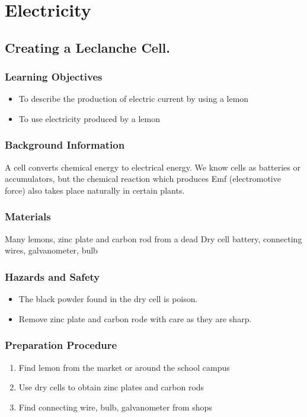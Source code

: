 \section{Electricity}

\subsection{Creating a Leclanche Cell.}

\subsubsection*{Learning Objectives}
\begin{itemize}
\item{To describe the production of electric current by using a lemon}
\item{To use electricity produced by a lemon}
\end{itemize}

\subsubsection*{Background Information}
A cell converts chemical energy to electrical energy.  We know cells as batteries or accumulators, but the chemical reaction which produces Emf (electromotive force) also takes place naturally in certain plants.

\subsubsection*{Materials}
Many lemons, zinc plate and carbon rod from a dead Dry cell battery, connecting wires, galvanometer, bulb

\subsubsection*{Hazards and Safety}
\begin{itemize}
\item{The black powder found in the dry cell is poison.}
\item{Remove zinc plate and carbon rode with care as they are sharp.}
\end{itemize}

\subsubsection*{Preparation Procedure}
\begin{enumerate}
\item{Find lemon from the market or around the school campus}
\item{Use dry cells to obtain zinc plates and carbon rods}
\item{Find connecting wire, bulb, galvanometer from shops}
\end{enumerate}

